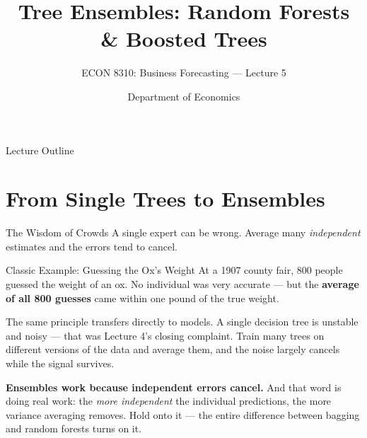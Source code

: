\documentclass[aspectratio=169, 11pt]{beamer}
\title[Tree Ensembles]{Tree Ensembles: Random Forests \& Boosted Trees}
\subtitle{ECON 8310: Business Forecasting --- Lecture 5}
\author{Department of Economics}
\institute{University of Nebraska at Omaha}
\begin{document}

\begin{frame}
  \titlepage
\end{frame}

\begin{frame}{Lecture Outline}
  \tableofcontents
\end{frame}

\section{From Single Trees to Ensembles}


\begin{frame}{The Wisdom of Crowds}
  A single expert can be wrong. Average many \emph{independent} estimates and the errors tend
  to cancel.
  \begin{examplebox}{Classic Example: Guessing the Ox's Weight}
    At a 1907 county fair, 800 people guessed the weight of an ox. No individual was very
    accurate --- but the \textbf{average of all 800 guesses} came within one pound of the
    true weight.
  \end{examplebox}

  \vspace{0.15cm}
  The same principle transfers directly to models. A single decision tree is unstable and
  noisy --- that was Lecture 4's closing complaint. Train many trees on different versions of
  the data and average them, and the noise largely cancels while the signal survives.

  \vspace{0.15cm}
  \textbf{Ensembles work because independent errors cancel.} And that word is doing real
  work: the \emph{more independent} the individual predictions, the more variance averaging
  removes. Hold onto it --- the entire difference between bagging and random forests turns on
  it.
\end{frame}

\end{document}
